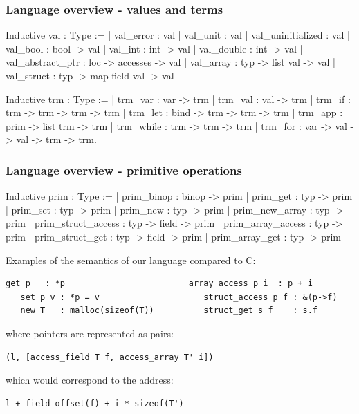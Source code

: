 \begin{frame}[fragile]
\frametitle{Language overview - values and terms}

\begin{coqs}
Inductive val : Type :=
  | val_error : val
  | val_unit : val
  | val_uninitialized : val
  | val_bool : bool -> val
  | val_int : int -> val
  | val_double : int -> val
  | val_abstract_ptr : loc -> accesses -> val
  | val_array : typ -> list val -> val
  | val_struct : typ -> map field val -> val
\end{coqs}

\begin{coqs}
Inductive trm : Type :=
  | trm_var : var -> trm
  | trm_val : val -> trm
  | trm_if : trm -> trm -> trm -> trm
  | trm_let : bind -> trm -> trm -> trm
  | trm_app : prim -> list trm -> trm
  | trm_while : trm -> trm -> trm
  | trm_for : var -> val -> val -> trm -> trm.
\end{coqs}

\end{frame}


\begin{frame}[fragile]
\frametitle{Language overview - primitive operations}

\begin{coqs}
  Inductive prim : Type :=
    | prim_binop : binop -> prim
    | prim_get : typ -> prim
    | prim_set : typ -> prim
    | prim_new : typ -> prim
    | prim_new_array : typ -> prim
    | prim_struct_access : typ -> field -> prim
    | prim_array_access : typ -> prim
    | prim_struct_get : typ -> field -> prim
    | prim_array_get : typ -> prim
\end{coqs}

Examples of the semantics of our language compared to C:

\begin{Verbatim}[fontsize=\scriptsize]
   get p   : *p                         array_access p i  : p + i
   set p v : *p = v                     struct_access p f : &(p->f)
   new T   : malloc(sizeof(T))          struct_get s f    : s.f
\end{Verbatim}

where pointers are represented as pairs:

\begin{Verbatim}[fontsize=\scriptsize]
   (l, [access_field T f, access_array T' i]) 
\end{Verbatim}

which would correspond to the address:

\begin{Verbatim}[fontsize=\scriptsize]
   l + field_offset(f) + i * sizeof(T')
\end{Verbatim}

\end{frame}


